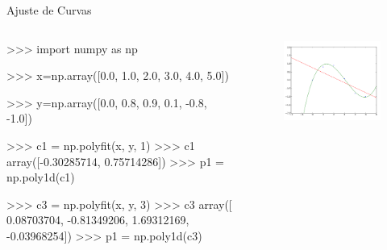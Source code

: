 \documentclass[12pt,t,graphics]{beamer}
\begin{document}
\begin{frame}[t,fragile]{Ajuste de Curvas}
	\begin{columns}
		\vspace{-0.3cm}
		\begin{python}
>>> import numpy as np

>>> x=np.array([0.0, 1.0, 2.0, 
3.0, 4.0, 5.0]) 

>>> y=np.array([0.0, 0.8, 0.9,
0.1, -0.8, -1.0]) 

>>> c1 = np.polyfit(x, y, 1) 
>>> c1
array([-0.30285714,  0.75714286])
>>> p1 = np.poly1d(c1) 

>>> c3 = np.polyfit(x, y, 3) 
>>> c3
array([ 0.08703704, -0.81349206, 
1.69312169, -0.03968254])
>>> p1 = np.poly1d(c3) 
		
		\end{python}
		\vspace{-1cm}
		\begin{figure}
			\centering
			\includegraphics[scale=0.4]{img/ac_deg1deg3.png}
		\end{figure}
	\end{columns}
\end{frame}
\end{document}
